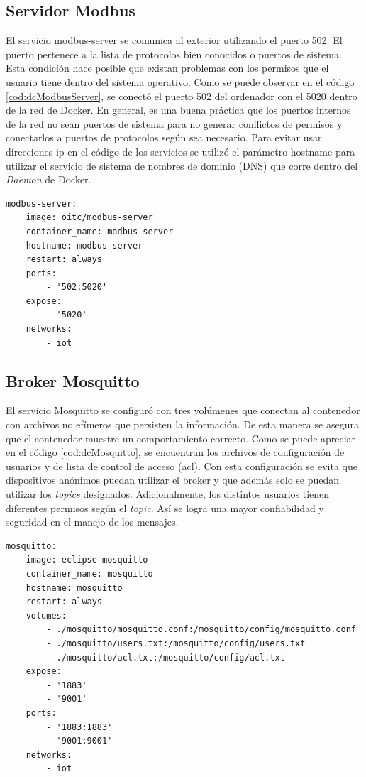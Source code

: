 \subsection{Servidor Modbus}

El servicio modbus-server se comunica al exterior utilizando el puerto 502.
El puerto pertenece a la lista de protocolos bien conocidos o puertos de sistema.
Esta condición hace posible que existan problemas con los permisos que el usuario tiene dentro del sistema operativo.
Como se puede observar en el código \ref{cod:dcModbusServer}, se conectó el puerto 502 del ordenador con el 5020 dentro de la red de Docker.
En general, es una buena práctica que los puertos internos de la red no sean puertos de sistema para no generar conflictos de permisos y conectarlos a puertos de protocolos según sea necesario.
Para evitar usar direcciones ip en el código de los servicios se utilizó el parámetro hostname para utilizar el servicio de sistema de nombres de dominio (DNS) que corre dentro del \emph{Daemon} de Docker.

\begin{lstlisting}[label=cod:dcModbusServer,caption=Orquestación del servidor Modbus.]
modbus-server:
	image: oitc/modbus-server
	container_name: modbus-server
	hostname: modbus-server
	restart: always
	ports:
		- '502:5020'
	expose: 
    	- '5020'
	networks: 
		- iot
\end{lstlisting}

\subsection{Broker Mosquitto}

El servicio Mosquitto se configuró con tres volúmenes que conectan al contenedor con archivos no efímeros que persisten la información.
De esta manera se asegura que el contenedor muestre un comportamiento correcto.
Como se puede apreciar en el código \ref{cod:dcMosquitto}, se encuentran los archivos de configuración de usuarios y de lista de control de acceso (acl).
Con esta configuración se evita que dispositivos anónimos puedan utilizar el broker y que además solo se puedan utilizar los \emph{topics} designados.
Adicionalmente, los distintos usuarios tienen diferentes permisos según el \emph{topic}.
Así se logra una mayor confiabilidad y seguridad en el manejo de los mensajes.

\begin{lstlisting}[label=cod:dcMosquitto,caption=Orquestación del broker Mosquitto.]
mosquitto:
	image: eclipse-mosquitto
	container_name: mosquitto
	hostname: mosquitto
	restart: always
	volumes: 
		- ./mosquitto/mosquitto.conf:/mosquitto/config/mosquitto.conf
		- ./mosquitto/users.txt:/mosquitto/config/users.txt
		- ./mosquitto/acl.txt:/mosquitto/config/acl.txt
	expose: 
		- '1883'
		- '9001'
	ports: 
		- '1883:1883'
		- '9001:9001'
	networks: 
		- iot
\end{lstlisting}

